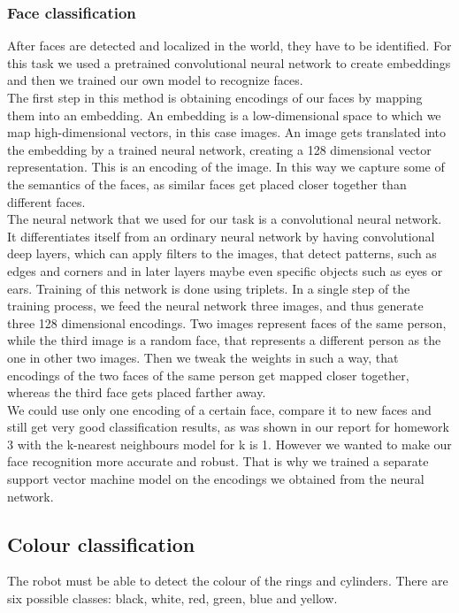 \documentclass[12pt,a4paper]{article}
\begin{document}
	\subsubsection{Face classification}
	After faces are detected and localized in the world, they have to be identified. For this task we used a pretrained convolutional neural network to create embeddings and then we trained our own model to recognize faces. \\

	The first step in this method is obtaining encodings of our faces by mapping them into an embedding. An embedding is a low-dimensional space to which we map high-dimensional vectors, in this case images. An image gets translated into the embedding by a trained neural network, creating a 128 dimensional vector representation. This is an encoding of the image. In this way we capture some of the semantics of the faces, as similar faces get placed closer together than different faces. \\

	The neural network that we used for our task is a convolutional neural network. It differentiates itself from an ordinary neural network by having convolutional deep layers, which can apply filters to the images, that detect patterns, such as edges and corners and in later layers maybe even specific objects such as eyes or ears. Training of this network is done using triplets. In a single step of the training process, we feed the neural network three images, and thus generate three 128 dimensional encodings. Two images represent faces of the same person, while the third image is a random face, that represents a different person as the one in other two images. Then we tweak the weights in such a way, that encodings of the two faces of the same person get mapped closer together, whereas the third face gets placed farther away. \\

	We could use only one encoding of a certain face, compare it to new faces and still get very good classification results, as was shown in our report for homework 3 with the k-nearest neighbours model for k is 1. However we wanted to make our face recognition more accurate and robust. That is why we trained a separate support vector machine model on the encodings we obtained from the neural network. \\
	
	\subsection{Colour classification} \label{colour_classification}
	The robot must be able to detect the colour of the rings and cylinders. There are six possible classes: black, white, red, green, blue and yellow. \\
	
\end{document}
